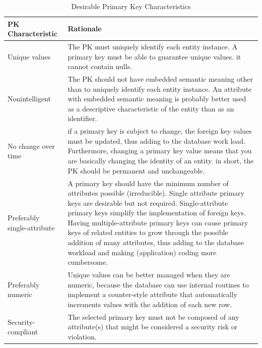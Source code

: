 \documentclass[a4paper, 12pt, titlepage]{report}
\begin{document}
{\begin{center}
\begin{longtable}{ ||p{5cm} | p{9cm}|| }
\caption{Desirable Primary Key Characteristics\label{long}}\\
\toprule
\toprule
PK Characteristic & Rationale\\ 
\midrule
Unique values & The PK must uniquely identify each entity instance. A primary key must be able to guarantee unique values. it cannot contain nulls.\\
\midrule
Nonintelligent & The PK should not have embedded semantic meaning other than to uniquely identify each entity instance. An attribute with embedded semantic meaning is probably better used as a descriptive characteristic of the entity than as an identifier. \\
\midrule
No change over time & if a primary key is subject to change, the foreign key values must be updated, thus adding to the database work load. Furthermore, changing a primary key value means that you are basically changing the identity of an entity. in short, the PK should be permanent and unchangeable.\\
\midrule
Preferably single-attribute & A primary key should have the minimum number of attributes possible (irreducible). Single attribute primary keys are desirable but not required. Single-attribute primary keys simplify the implementation of foreign keys. Having multiple-attribute primary keys can cause primary keys of related entities to grow through the possible addition of many attributes, thus adding to the database workload and making (application) coding more cumbersome.\\
\midrule
Preferably numeric & Unique values can be better managed when they are numeric, because the database can use internal routines to implement a counter-style attribute that automatically increments values with the addition of each new row. \\
\midrule
Security-compliant & The selected primary key must not be composed of any attribute(s) that might be considered a security risk or violation.\\
\bottomrule
\bottomrule
\end{longtable}
\end{center}
}
\end{document}
